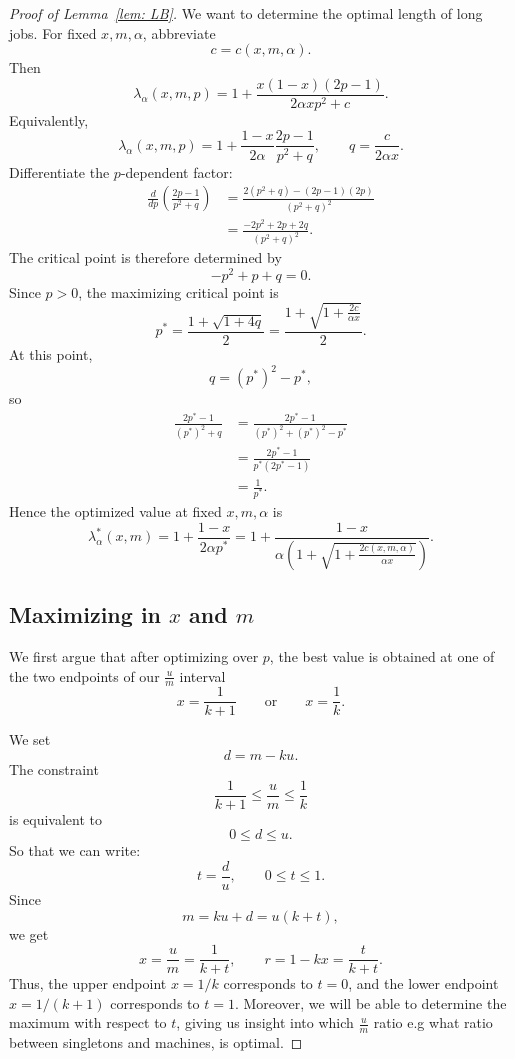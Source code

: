 \documentclass[%
english, titlepage=false %
]{./tum-templates/book/tumbook}
\begin{document}
\begin{proof}[\hypertarget{proof:LB}{Proof of Lemma~\ref{lem: LB}}]
We want to determine the optimal length of long jobs.
For fixed \(x,m,\alpha\), abbreviate
\[
        c=c(x,m,\alpha).
\]
Then
\[
        \lambda_{\alpha}(x,m,p)
        =
        1+
        \frac{x(1-x)(2p-1)}{2\alpha xp^2+c}.
\]
Equivalently,
\[
        \lambda_{\alpha}(x,m,p)
        =
        1+
        \frac{1-x}{2\alpha}
        \frac{2p-1}{p^2+q},
        \qquad
        q=\frac{c}{2\alpha x}.
\]
Differentiate the \(p\)-dependent factor:
\[
\begin{aligned}
\frac{d}{dp}\left(\frac{2p-1}{p^2+q}\right)
&=
\frac{2(p^2+q)-(2p-1)(2p)}{(p^2+q)^2} \\
&=
\frac{-2p^2+2p+2q}{(p^2+q)^2}.
\end{aligned}
\]
The critical point is therefore determined by
\[
        -p^2+p+q=0.
\]
Since \(p>0\), the maximizing critical point is
\[
        p^*
        =
        \frac{1+\sqrt{1+4q}}{2}
        =
        \frac{1+\sqrt{1+\frac{2c}{\alpha x}}}{2}.
\]
At this point,
\[
        q=(p^*)^2-p^*,
\]
so
\[
\begin{aligned}
\frac{2p^*-1}{(p^*)^2+q}
&=
\frac{2p^*-1}{(p^*)^2+(p^*)^2-p^*}  \\
&=
\frac{2p^*-1}{p^*(2p^*-1)} \\
&=
\frac{1}{p^*}.
\end{aligned}
\]
Hence the optimized value at fixed \(x,m, \alpha\) is
\[
\boxed{
        \lambda^*_{\alpha}(x,m)
        =
        1+
        \frac{1-x}{2\alpha p^*}
        =
        1+
        \frac{1-x}{\alpha\left(1+\sqrt{1+\frac{2c(x,m,\alpha)}{\alpha x}}\right)}
        }.
\]

\subsection*{\texorpdfstring{Maximizing in \(x\) and \(m\)}{Maximizing in x and m}}


We first argue that after optimizing over \(p\), the best value is
obtained at one of the two endpoints of our $\frac{u}{m}$ interval
\[
        x=\frac{1}{k+1}
        \qquad\text{or}\qquad
        x=\frac1k.
\]

We set
\[
        d=m-ku.
\]
The constraint
\[
        \frac{1}{k+1}\leq \frac{u}{m}\leq \frac1k
\]
is equivalent to
\[
        0\leq d\leq u.
\]
So that we can write:
\[
        t=\frac{d}{u},
        \qquad 0\leq t\leq 1.
\]
Since
\[
        m=ku+d=u(k+t),
\]
we get
\[
        x=\frac{u}{m}=\frac{1}{k+t},
        \qquad
        r=1-kx=\frac{t}{k+t}.
\]
Thus, the upper endpoint \(x=1/k\) corresponds to \(t=0\), and the lower
endpoint \(x=1/(k+1)\) corresponds to \(t=1\). Moreover, we will be able to determine the maximum
with respect to $t$, giving us insight into which $\frac{u}{m}$ ratio e.g what ratio between
singletons and machines, is optimal.


\end{proof}
\end{document}
